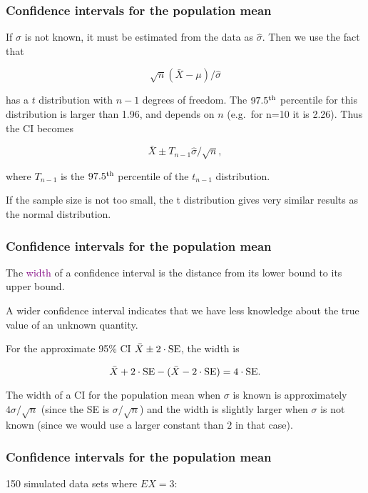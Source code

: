 \begin{frame}
\frametitle{Confidence intervals for the population mean}

If $\sigma$ is not known, it must be estimated from the data as
$\hat{\sigma}$.  Then we use the fact that

$$
\sqrt{n}(\bar{X} - \mu)/\hat{\sigma}
$$

has a $t$ distribution with $n-1$ degrees of freedom.  The $97.5^{\rm
th}$ percentile for this distribution is larger than 1.96, and depends
on $n$ (e.g.\ for n=10 it is 2.26).  Thus the CI becomes

$$
\bar{X} \pm T_{n-1} \hat{\sigma}/\sqrt{n},
$$

where $T_{n-1}$ is the $97.5^{\rm th}$ percentile of the $t_{n-1}$
distribution.

If the sample size is not too small, the t distribution gives very
similar results as the normal distribution.

\end{frame}


\begin{frame}
\frametitle{Confidence intervals for the population mean}

The \textcolor{purple}{width} of a confidence interval is the distance from
its lower bound to its upper bound.

A wider confidence interval indicates that we have less knowledge
about the true value of an unknown quantity.

For the approximate 95\% CI $\bar{X}\pm 2\cdot{\rm SE}$, the width is

$$ \bar{X}+2\cdot{\rm SE} - (\bar{X}-2\cdot{\rm SE}) = 4\cdot{\rm SE}.
$$

The width of a CI for the population mean when $\sigma$ is known is
approximately $4\sigma/\sqrt{n}$ (since the SE is $\sigma/\sqrt{n}$)
and the width is slightly larger when $\sigma$ is not known (since we
would use a larger constant than $2$ in that case).

\end{frame}

\begin{frame}
\frametitle{Confidence intervals for the population mean}

150 simulated data sets where $EX=3$:

\medskip


\end{frame}

